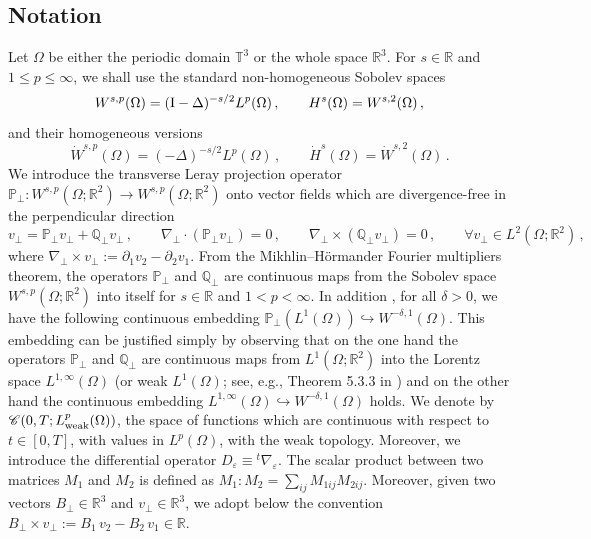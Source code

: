 \documentclass[11pt,reqno]{amsart}
\def \R{{\mathbb{R}}}
\def \Q{{\mathbb{Q}}}
\def \T{{\mathbb{T}}}
\def \P{{\mathbb{P}}}
\begin{document}
\subsection{Notation}\label{ss:notations}
Let $\Omega$ be either the periodic domain $\T^3$ or the whole space $\R^3$. For $s\in \R$ and $1\leq p \leq \infty$, we shall use the  standard non-homogeneous Sobolev spaces
\[
W^{s,p}(\Omega)=({\rm I}-\Delta)^{-s/2}L^p(\Omega) \, , \qquad H^s(\Omega)=W^{s,2}(\Omega) \, ,
\]
and their  homogeneous versions
\[
\dot W^{s,p}(\Omega)=(-\Delta)^{-s/2}L^p(\Omega) \, , \qquad \dot H^s(\Omega)=\dot W^{s,2}(\Omega) \, .
\]
We introduce the transverse Leray projection operator $\P_\perp : W^{s,p}(\Omega; \R^2) \rightarrow  W^{s,p}(\Omega; \R^2)$ onto vector fields which are divergence-free in the perpendicular direction
\[
v_\perp =\P_\perp v_\perp + \Q_\perp v_\perp\,, \qquad \nabla_\perp \cdot (\P_\perp v_\perp ) = 0\,, \qquad \nabla_\perp \times  (\Q_\perp v_\perp) =0\,, \qquad \forall v_\perp \in L^2(\Omega;\R^2)\,,
\]
where $\nabla_\perp \times v_\perp :=  \partial_1  v_2 -  \partial_2 v_1 $. From the Mikhlin--H\"ormander Fourier multipliers theorem, the operators $\P_\perp$ and $\Q_\perp$ are continuous maps from the Sobolev space $W^{s,p}(\Omega; \R^2)$ into itself for  $s\in \R$ and $1<p<\infty$. In addition \cite{LM98}, for all $ \delta >0 $, we have the following continuous  embedding $ \P_\perp (L^1(\Omega)) \hookrightarrow W^{-\delta,1}(\Omega) $. This embedding can be justified simply by observing that on the one hand the operators $\P_\perp$ and $\Q_\perp$ are continuous maps from  $L^1(\Omega; \R^2)$ into the Lorentz space $L^{1,\infty}(\Omega)$ (or weak $L^1(\Omega)$; see, e.g., Theorem 5.3.3 in \cite{Gra14}) and on the other hand the continuous embedding $L^{1,\infty}(\Omega) \hookrightarrow W^{-\delta,1}(\Omega)$ holds. We denote by $\mathscr{C}(0,T; L_{\rm weak}^p(\Omega))$, the space of functions which are continuous with respect to $t\in [0,T]$, with values in $L^p(\Omega)$, with the weak topology. Moreover, we introduce the differential operator $D_\varepsilon \equiv {}^t \nabla_\varepsilon$. The scalar product between two matrices $M_1$ and $M_2$ is  defined as $M_1:M_2 = \sum_{ij} M_{1ij} M_{2ij}$. Moreover, given two vectors $ B_\perp \in \R^3 $ and $ v_\perp \in \R^3 $, we adopt below the convention $ B_\perp \times v_\perp := B_1 \, v_2 - B_2 \, v_1 \in \R $.

\end{document}
